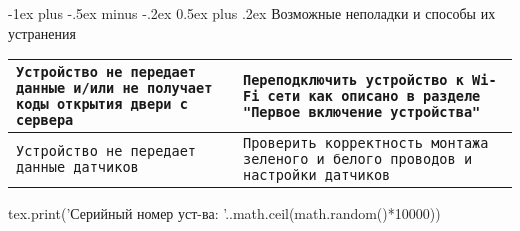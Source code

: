 \documentclass[a4paper,10pt,landscape]{article}
\makeatletter
\renewcommand{\section}{\@startsection{section}{1}{0mm}%
                                {-1ex plus -.5ex minus -.2ex}%
                                {0.5ex plus .2ex}%
                                {\normalfont\large\bfseries}}
\makeatother
\begin{document}
\begin{multicols}{3}
\section{Возможные неполадки и способы их устранения}

\noindent\begin{tabular}{p{4cm}|p{4cm}}
\texttt{Устройство не передает данные и/или не получает коды открытия двери с сервера}&\texttt{Переподключить устройство к Wi-Fi сети как описано в разделе "Первое включение устройства"}\\
\hline
\texttt{Устройство не передает данные датчиков}&\texttt{Проверить корректность монтажа зеленого и белого проводов и настройки датчиков}\\
\hline
\end{tabular}

\Large{	
\begin{luacode}
tex.print('Серийный номер уст-ва: '..math.ceil(math.random()*10000))
\end{luacode}
}

\end{multicols}
\end{document}
